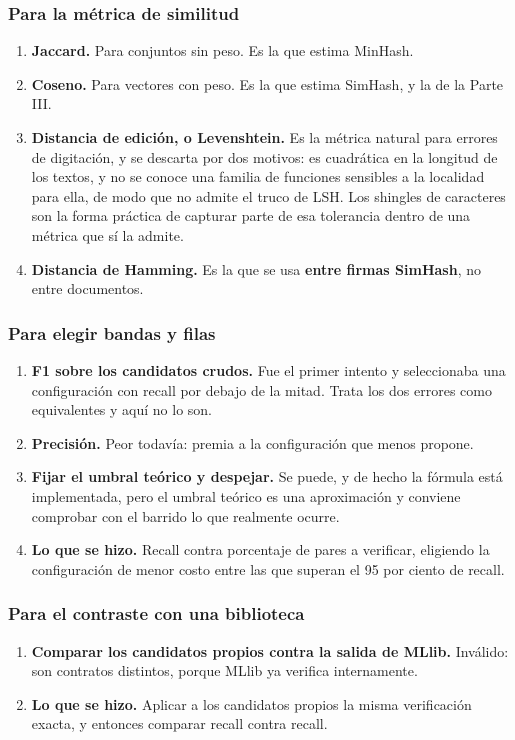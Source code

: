 \documentclass[11pt]{article}
\begin{document}
\subsubsection*{Para la métrica de similitud}
\begin{enumerate}
  \item \textbf{Jaccard.} Para conjuntos sin peso. Es la que estima MinHash.
  \item \textbf{Coseno.} Para vectores con peso. Es la que estima SimHash, y la de la Parte III.
  \item \textbf{Distancia de edición, o Levenshtein.} Es la métrica natural para errores de digitación, y se descarta por dos motivos: es cuadrática en la longitud de los textos, y no se conoce una familia de funciones sensibles a la localidad para ella, de modo que no admite el truco de LSH. Los shingles de caracteres son la forma práctica de capturar parte de esa tolerancia dentro de una métrica que sí la admite.
  \item \textbf{Distancia de Hamming.} Es la que se usa \textbf{entre firmas SimHash}, no entre documentos.
\end{enumerate}
\subsubsection*{Para elegir bandas y filas}
\begin{enumerate}
  \item \textbf{F1 sobre los candidatos crudos.} Fue el primer intento y seleccionaba una configuración con recall por debajo de la mitad. Trata los dos errores como equivalentes y aquí no lo son.
  \item \textbf{Precisión.} Peor todavía: premia a la configuración que menos propone.
  \item \textbf{Fijar el umbral teórico y despejar.} Se puede, y de hecho la fórmula está implementada, pero el umbral teórico es una aproximación y conviene comprobar con el barrido lo que realmente ocurre.
  \item \textbf{Lo que se hizo.} Recall contra porcentaje de pares a verificar, eligiendo la configuración de menor costo entre las que superan el 95 por ciento de recall.
\end{enumerate}
\subsubsection*{Para el contraste con una biblioteca}
\begin{enumerate}
  \item \textbf{Comparar los candidatos propios contra la salida de MLlib.} Inválido: son contratos distintos, porque MLlib ya verifica internamente.
  \item \textbf{Lo que se hizo.} Aplicar a los candidatos propios la misma verificación exacta, y entonces comparar recall contra recall.
\end{enumerate}
\end{document}

